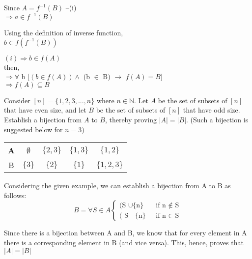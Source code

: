 \documentclass[addpoints]{exam}
\begin{document}
\begin{questions}
\begin{solution}
    Since  $A = f^{-1}(B)$ --(i)\\
    
    $\Rightarrow a \in f^{-1}(B)$
    
    Using the definition of inverse function,\\
    $b \in f(f^{-1}(B)) $
    
    $(i) \Rightarrow b \in f(A)$\\
    
    then,\\
    
    $\Rightarrow \forall$ b [$(b \in f(A))\wedge$ (b $\in$ B) $\rightarrow$  $f(A) = B $]\\
    
    $\Rightarrow f(A) \subseteq B  $
    
    
    
    
  \end{solution}

\question[15] Consider $[n] = \{1,2,3,...,n\}$ where $n \in \mathbb{N}$. Let $A$ be the set of subsets of $[n]$ that have even size, and let $B$ be the set of subsets of $[n]$ that have odd size. Establish a bijection from $A$ to $B$, thereby proving $|A| = |B|$. (Such a bijection is suggested below for $n = 3$) 
 
\begin{center}

  \begin{tabular}{ |c || c | c | c |c |}
    \hline
 A & $\emptyset$ & $\{2,3\}$ & $\{1,3\}$ & $\{1,2\}$ \\ \hline
 B & $\{3\}$ & $\{2\}$ & $\{1\}$ & $\{1,2,3\}$\\\hline
\end{tabular}
\end{center}

  \begin{solution}
    Considering the given example, we can establish a bijection from A to B as follows:\\
\[    
    B= \forall S \in A
    \begin{cases}
         (\textrm{S $\cup \{$n$\}$ } &  \textrm{if n $\notin$ S}\\
         (\textrm { S - $\{$n$\}$ } &  \textrm{if n $\in$ S}
  
    \end{cases}
\]

    Since there is a bijection between A and B, we know that for every element in A there is a corresponding element in B (and vice versa). This, hence, proves that $|A|= |B|$
  \end{solution}
  

\end{questions}
\end{document}
